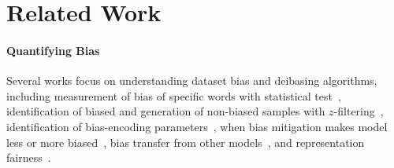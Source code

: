
\section{Related Work}

%



\paragraph{Quantifying Bias}
Several works focus on understanding dataset bias and deibasing algorithms, including measurement of bias of specific words with statistical test~\citep{gardner-etal-2021-competency}, identification of biased and generation of non-biased samples with $z$-filtering~\citep{wu-etal-2022-generating}, identification of bias-encoding parameters~\citep{yu-etal-2023-unlearning}, when bias mitigation makes model less or more biased~\citep{ravichander-etal-2023-bias}, bias transfer from  other models~\citep{jin-etal-2021-transferability}, and  representation fairness~\citep{shen-etal-2022-representational}. 


